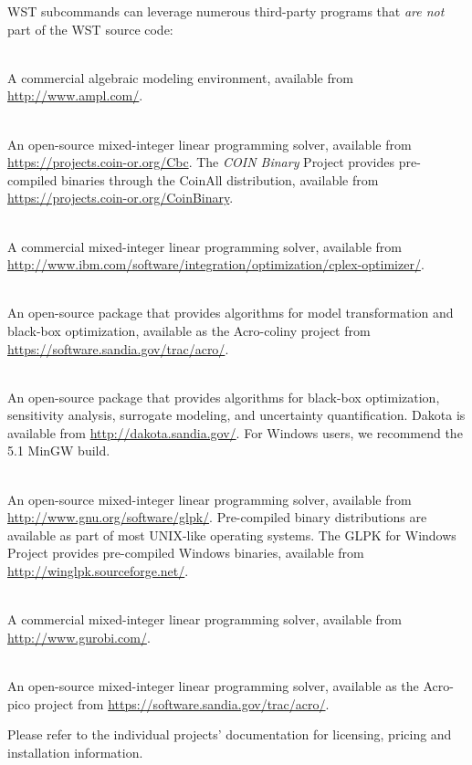 WST subcommands can leverage numerous third-party programs that
\emph{are not} part of the WST source code:
\begin{description}[topsep=0pt,parsep=0.5em,itemsep=-0.4em,labelindent=2em,leftmargin=4em]
\item[AMPL]\hfill\\ A commercial algebraic modeling environment, available from
  \url{http://www.ampl.com/}.
\item[CBC]\hfill\\ An open-source mixed-integer linear programming
  solver, available from \url{https://projects.coin-or.org/Cbc}. The
  \emph{COIN Binary} Project provides pre-compiled binaries through the
  CoinAll distribution,
  available from \url{https://projects.coin-or.org/CoinBinary}.
\item[CPLEX]\hfill\\ A commercial mixed-integer linear programming solver,
  available from
  \url{http://www.ibm.com/software/integration/optimization/cplex-optimizer/}.
\item[Coliny]\hfill\\ An open-source package that provides algorithms for model
  transformation and black-box optimization, available as the
  Acro-coliny project from
  \url{https://software.sandia.gov/trac/acro/}.
\item[Dakota]\hfill\\ An open-source package that provides algorithms for
  black-box optimization, sensitivity analysis, surrogate modeling, and
  uncertainty quantification. Dakota is available from
  \url{http://dakota.sandia.gov/}. For Windows users, we recommend the
  5.1 MinGW build.
\item[GLPK]\hfill\\ An open-source mixed-integer linear programming
  solver, available from \url{http://www.gnu.org/software/glpk/}.
  Pre-compiled binary distributions are available as part of most
  UNIX-like operating systems. The GLPK for Windows Project
  provides pre-compiled Windows binaries, available from
  \url{http://winglpk.sourceforge.net/}.
\item[Gurobi]\hfill\\ A commercial mixed-integer linear programming solver,
  available from
  \url{http://www.gurobi.com/}.
\item[PICO]\hfill\\ An open-source mixed-integer linear programming solver,
  available as the Acro-pico project from
  \url{https://software.sandia.gov/trac/acro/}.
\end{description}
Please refer to the individual projects' documentation for licensing,
pricing and installation information.


